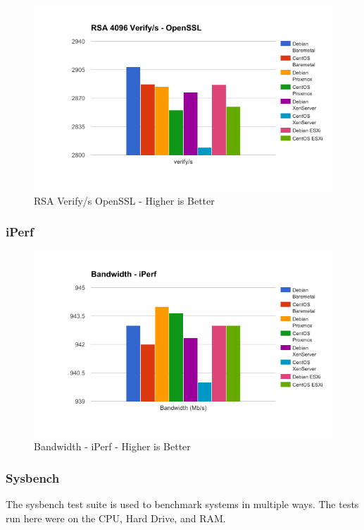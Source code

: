 \documentclass[12pt]{spieman}  %
\begin{document}
\begin{figure}[H]
\caption{RSA Verify/s OpenSSL - Higher is Better}
\centering
\includegraphics[width=\textwidth,keepaspectratio]{Graphs/RSA-Verify-OpenSSL}
\end{figure}

\subsubsection{iPerf}

\begin{figure}[H]
\caption{Bandwidth - iPerf - Higher is Better}
\centering
\includegraphics[width=\textwidth,keepaspectratio]{Graphs/Bandwidth-iPerf}
\end{figure}

\subsubsection{Sysbench}

The sysbench test suite is used to benchmark systems in multiple ways. The tests run here were on the CPU, Hard Drive, and RAM.\\
\end{document}
